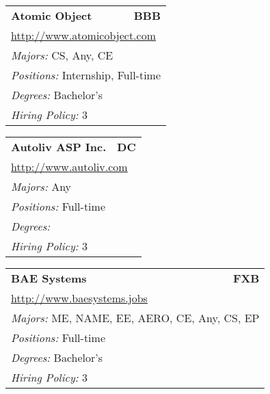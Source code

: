 \documentclass[twoside]{article}
\begin{document}
\begin{center}
\begin{multicols}{3}
\begin{FlushLeft}
\begin{minipage}{.9\columnwidth}
\end{minipage}
 
\begin{minipage}{.9\columnwidth}\begin{tabularx}{.95\columnwidth}{Xr}
                 {\Large\bf Atomic Object} & {\Large\bf BBB}\\
    \multicolumn{2}{p{.95\columnwidth}}{\url{http://www.atomicobject.com}}\\
    \multicolumn{2}{p{.95\columnwidth}}{\emph{Majors:} CS, Any, CE}\\
    \multicolumn{2}{p{.95\columnwidth}}{\emph{Positions:} Internship, Full-time}\\
    \multicolumn{2}{p{.95\columnwidth}}{\emph{Degrees:} Bachelor's}\\
    \multicolumn{2}{p{.95\columnwidth}}{\emph{Hiring Policy:} 3}\\
    \end{tabularx}
    
\end{minipage}
 
\begin{minipage}{.9\columnwidth}\begin{tabularx}{.95\columnwidth}{Xr}
                 {\Large\bf Autoliv ASP Inc.} & {\Large\bf DC}\\
    \multicolumn{2}{p{.95\columnwidth}}{\url{http://www.autoliv.com}}\\
    \multicolumn{2}{p{.95\columnwidth}}{\emph{Majors:} Any}\\
    \multicolumn{2}{p{.95\columnwidth}}{\emph{Positions:} Full-time}\\
    \multicolumn{2}{p{.95\columnwidth}}{\emph{Degrees:} }\\
    \multicolumn{2}{p{.95\columnwidth}}{\emph{Hiring Policy:} 3}\\
    \end{tabularx}
    
\end{minipage}
 
\begin{minipage}{.9\columnwidth}\begin{tabularx}{.95\columnwidth}{Xr}
                 {\Large\bf BAE Systems} & {\Large\bf FXB}\\
    \multicolumn{2}{p{.95\columnwidth}}{\url{http://www.baesystems.jobs}}\\
    \multicolumn{2}{p{.95\columnwidth}}{\emph{Majors:} ME, NAME, EE, AERO, CE, Any, CS, EP}\\
    \multicolumn{2}{p{.95\columnwidth}}{\emph{Positions:} Full-time}\\
    \multicolumn{2}{p{.95\columnwidth}}{\emph{Degrees:} Bachelor's}\\
    \multicolumn{2}{p{.95\columnwidth}}{\emph{Hiring Policy:} 3}\\
    \end{tabularx}
    

\end{minipage}
\end{FlushLeft}
\end{multicols}
\end{center}
\end{document}
